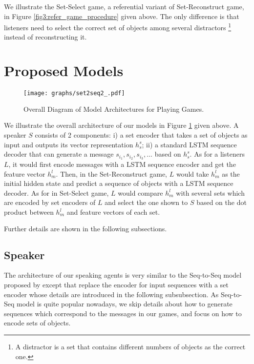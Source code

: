 We illustrate the Set-Select game, a referential variant of Set-Reconstruct game, in Figure \ref{fig3:refer_game_procedure} given above. The only difference is that listeners need to select the correct set of objects among several distractors \footnote{A distractor is a set that contains different numbers of objects as the correct one.} instead of reconstructing it. 

\section{Proposed Models}
\label{sec3.2:models}

\begin{figure}[!h]
  \centering
  \texttt{[image: graphs/set2seq2\_.pdf]}
  \caption{Overall Diagram of Model Architectures for Playing Games.}
  \label{fig4:model_arch}
\end{figure}

We illustrate the overall architecture of our models in Figure \ref{fig4:model_arch} given above. A speaker $S$ consists of 2 components: i) a set encoder that takes a set of objects as input and outputs its vector representation $h_s^s$; ii) a standard LSTM sequence decoder that can generate a message $s_{i_1}, s_{i_2}, s_{i_3}, \dots$ based on $h_s^s$. As for a listeners $L$, it would first encode messages with a LSTM sequence encoder and get the feature vector $h^l_m$. Then, in the Set-Reconstruct game, $L$ would take $h^l_m$ as the initial hidden state and predict a sequence of objects with a LSTM sequence decoder. As for in Set-Select game, $L$ would compare $h^l_m$ with several sets which are encoded by set encoders of $L$ and select the one shown to $S$ based on the dot product between $h^l_m$ and feature vectors of each set.

Further details are shown in the following subsections.

\subsection{Speaker}
\label{ssec3.2.1:speaker}

The architecture of our speaking agents is very similar to the Seq-to-Seq model proposed by \cite{sutskever2014sequence} except that replace the encoder for input sequences with a set encoder whose details are introduced in the following subsubsection. As Seq-to-Seq model is quite popular nowadays, we skip details about how to generate sequences which correspond to the messages in our games, and focus on how to encode sets of objects.

